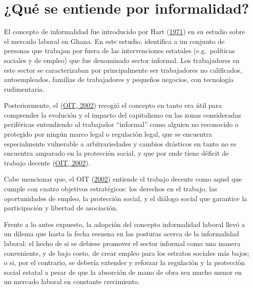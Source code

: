 \documentclass[
  letterpaper,
  12pt,
  oneside,
  spanish,
  doublespacing,
  headsepline,
  parskip]{MastersDoctoralThesis}
\begin{document}
\hypertarget{quuxe9-se-entiende-por-informalidad}{%
\section{¿Qué se entiende por
informalidad?}\label{quuxe9-se-entiende-por-informalidad}}

El concepto de informalidad fue introducido por Hart
(\protect\hyperlink{ref-hart1971}{1971}) en su estudio sobre el mercado
laboral en Ghana. En este estudio, identifica a un conjunto de personas
que trabajan por fuera de las intervenciones estatales (e.g.~políticas
sociales y de empleo) que fue denominado sector informal. Los
trabajadores en este sector se caracterizaban por principalmente ser
trabajadores no calificados, autoempleados, familias de trabajadores y
pequeños negocios, con tecnología rudimentaria.

Posteriormente, el (\protect\hyperlink{ref-oit2002}{OIT, 2002}) recogió
el concepto en tanto era útil para comprender la evolución y el impacto
del capitalismo en las zonas consideradas periféricas entendiendo al
trabajador ``informal'' como alguien no reconocido o protegido por
ningún marco legal o regulación legal, que se encuentra especialmente
vulnerable a arbitrariedades y cambios drásticos en tanto no se
encuentra amparado en la protección social, y que por ende tiene déficit
de trabajo decente (\protect\hyperlink{ref-oit2002}{OIT, 2002}).

Cabe mencionar que, el OIT (\protect\hyperlink{ref-oit2002}{2002})
entiende el trabajo decente como aquel que cumple con cuatro objetivos
estratégicos: los derechos en el trabajo, las oportunidades de empleo,
la protección social, y el diálogo social que garantice la participación
y libertad de asociación.

Frente a lo antes expuesto, la adopción del concepto informalidad
laboral llevó a un dilema que hasta la fecha resuena en las posturas
acerca de la informalidad laboral: el hecho de si se debiese promover el
sector informal como una manera conveniente, y de bajo costo, de crear
empleo para los estratos sociales más bajos; o si, por el contrario, se
debería extender y reforzar la regulación y la protección social estatal
a pesar de que la absorción de mano de obra sea mucho menor en un
mercado laboral en constante crecimiento.
\end{document}
